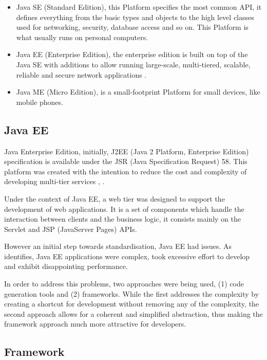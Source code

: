\begin{itemize}
	\item Java SE (Standard Edition), this Platform specifies the most common API, it defines everything from the basic types and objects to the high level classes used for networking, security, database access and so on. This Platform is what usually runs on personal computers.
	\item Java EE (Enterprise Edition), the enterprise edition is built on top of the Java SE with additions to allow running large-scale, multi-tiered, scalable, reliable and secure network applications \cite{firstcup}.
	\item Java ME (Micro Edition), is a small-footprint Platform for small devices, like mobile phones.
\end{itemize}

\subsection{Java EE}

Java Enterprise Edition, initially, J2EE (Java 2 Platform, Enterprise Edition) specification is available under the JSR (Java Specification Request) 58. This platform was created with the intention to reduce the cost and complexity of developing multi-tier services \cite{jsr58}, \cite{javaEEDeveloperGuide}. 

Under the context of Java EE, a web tier was designed to support the development of web applications. It is a set of components which handle the interaction between clients and the business logic, it consists mainly on the Servlet and JSP (JavaServer Pages) APIs\cite{jsrServletAPI}.

However an initial step towards standardisation, Java EE had issues. As \cite{javaDevelopmentWithSpring} identifies, Java EE applications were complex, took excessive effort to develop and exhibit disappointing performance.

In order to address this problems, two approaches were being used, (1) code generation tools and (2) frameworks. While the first addresses the complexity by creating a shortcut for development without removing any of the complexity, the second approach allows for a coherent and simplified abstraction, thus making the framework approach much more attractive for developers.

\subsection{Framework}

